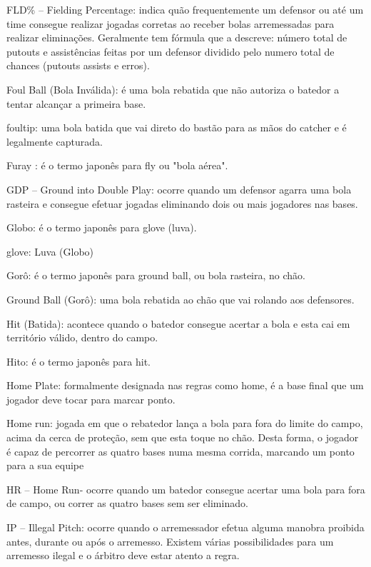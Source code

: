  FLD\% -- Fielding Percentage: indica quão frequentemente um defensor ou até um time consegue realizar jogadas corretas ao receber bolas arremessadas para realizar eliminações. Geralmente tem fórmula que a descreve: número total de putouts e assistências feitas por um defensor dividido pelo numero total de chances (putouts assists e erros).




 Foul Ball (Bola Inválida): é uma bola rebatida que não autoriza o batedor a tentar alcançar a primeira base.

 \gls{foultip}: uma bola batida que vai direto do bastão para as mãos do catcher e é legalmente capturada.

 Furay : é o termo japonês para \gls{fly} ou "bola aérea".

 GDP -- Ground into Double Play: ocorre quando um defensor agarra uma bola rasteira e consegue efetuar jogadas eliminando dois ou mais jogadores nas bases.

 Globo: é o termo japonês para \gls{glove} (luva).

 glove: Luva (Globo)

 Gorô: é o termo japonês para \gls{ground} ball, ou bola rasteira, no chão.

 Ground Ball (Gorô): uma bola rebatida ao chão que vai rolando aos defensores.



 Hit (Batida): acontece quando o batedor consegue acertar a bola e esta cai em território válido, dentro do campo.

 Hito: é o termo japonês para \gls{hit}.

 Home Plate: formalmente designada nas regras como \gls{home}, é a base final que um jogador deve tocar para marcar ponto.

 Home run: jogada em que o rebatedor lança a bola para fora do limite do campo, acima da cerca de proteção, sem que esta toque no chão. Desta forma, o jogador é capaz de percorrer as quatro bases numa mesma corrida, marcando um ponto para a sua equipe

 HR -- Home Run- ocorre quando um batedor consegue acertar uma bola para fora de campo, ou correr as quatro bases sem ser eliminado.

 IP -- Illegal Pitch: ocorre quando o arremessador efetua alguma manobra proibida antes, durante ou após o arremesso. Existem várias possibilidades para um arremesso ilegal e o árbitro deve estar atento a regra.


